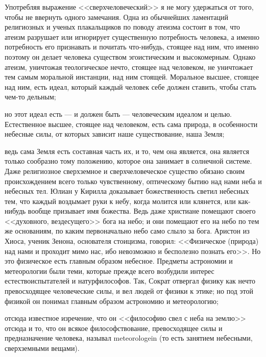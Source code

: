 \documentclass[12pt]{article}
\begin{document}
Употребляя выражение <<сверхчеловеческий>>  я не могу удержаться от того, чтобы не ввернуть одного замечания. Одна из обычнейших ламентаций религиозных и ученых плакальщиков по поводу атеизма состоит в том, что атеизм разрушает или игнорирует существенную потребность человека, а именно потребность его признавать и почитать что-нибудь, стоящее над ним, что именно поэтому он делает человека существом эгоистическим и высокомерным. Однако атеизм, уничтожая теологическое нечто, стоящее над человеком, не уничтожает тем самым моральной инстанции, над ним стоящей. Моральное высшее, стоящее над ним, есть идеал, который каждый человек себе должен ставить, чтобы стать чем-то дельным; 

но этот идеал есть --- и должен быть --- человеческим идеалом и целью. Естественное высшее, стоящее над человеком, есть сама природа, в особенности небесные силы, от которых зависит наше существование, наша Земля; 

ведь сама Земля есть составная часть их, и то, чем она является, она является только сообразно тому положению, которое она занимает в солнечной системе. Даже религиозное сверхземное и сверхчеловеческое существо обязано своим происхождением всего только чувственному, оптическому бытию над нами неба и небесных тел. Юлиан у Кирилла доказывает божественность светил небесных тем, что каждый воздымает руки к небу, когда молится или клянется, или как-нибудь вообще призывает имя божества. Ведь даже христиане помещают своего <<духовного, вездесущего>> бога на небо; и они помещают его на небо по тем же основаниям, по каким первоначально небо само слыло за бога. Аристон из Хиоса, ученик Зенона, основателя стоицизма, говорил: <<Физическое (природа) над нами и проходит мимо нас, ибо невозможно и бесполезно познать его>>. Но это физическое есть главным образом небесное. Предметы астрономии и метеорологии были теми, которые прежде всего возбудили интерес естествоиспытателей и натурфилософов. Так, Сократ отвергал физику как нечто превосходящее человеческие силы, и вел людей от физики к этике; но под этой физикой он понимал главным образом астрономию и метеорологию; 

отсюда известное изречение, что он <<философию свел с неба на землю>>  отсюда и то, что он всякое философствование, превосходящее силы и предназначение человека, называл meteorologein (то есть занятием небесными, сверхземными вещами). 
\end{document}

